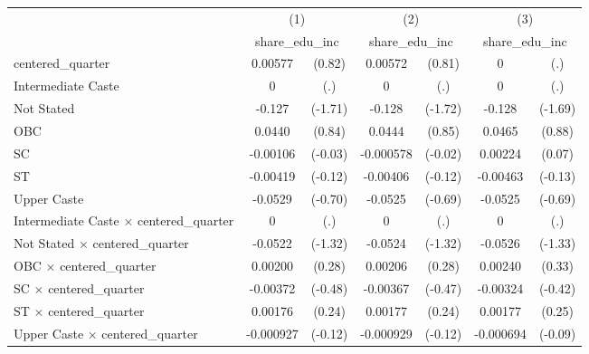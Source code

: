 {
\def\sym#1{\ifmmode^{#1}\else\(^{#1}\)\fi}
\begin{tabular}{l*{3}{cc}}
\hline\hline
                    &\multicolumn{2}{c}{(1)}           &\multicolumn{2}{c}{(2)}           &\multicolumn{2}{c}{(3)}           \\
                    &\multicolumn{2}{c}{share\_edu\_inc} &\multicolumn{2}{c}{share\_edu\_inc} &\multicolumn{2}{c}{share\_edu\_inc} \\
\hline
centered\_quarter    &     0.00577         &      (0.82)&     0.00572         &      (0.81)&           0         &         (.)\\
Intermediate Caste  &           0         &         (.)&           0         &         (.)&           0         &         (.)\\
Not Stated          &      -0.127         &     (-1.71)&      -0.128         &     (-1.72)&      -0.128         &     (-1.69)\\
OBC                 &      0.0440         &      (0.84)&      0.0444         &      (0.85)&      0.0465         &      (0.88)\\
SC                  &    -0.00106         &     (-0.03)&   -0.000578         &     (-0.02)&     0.00224         &      (0.07)\\
ST                  &    -0.00419         &     (-0.12)&    -0.00406         &     (-0.12)&    -0.00463         &     (-0.13)\\
Upper Caste         &     -0.0529         &     (-0.70)&     -0.0525         &     (-0.69)&     -0.0525         &     (-0.69)\\
Intermediate Caste $\times$ centered\_quarter&           0         &         (.)&           0         &         (.)&           0         &         (.)\\
Not Stated $\times$ centered\_quarter&     -0.0522         &     (-1.32)&     -0.0524         &     (-1.32)&     -0.0526         &     (-1.33)\\
OBC $\times$ centered\_quarter&     0.00200         &      (0.28)&     0.00206         &      (0.28)&     0.00240         &      (0.33)\\
SC $\times$ centered\_quarter&    -0.00372         &     (-0.48)&    -0.00367         &     (-0.47)&    -0.00324         &     (-0.42)\\
ST $\times$ centered\_quarter&     0.00176         &      (0.24)&     0.00177         &      (0.24)&     0.00177         &      (0.25)\\
Upper Caste $\times$ centered\_quarter&   -0.000927         &     (-0.12)&   -0.000929         &     (-0.12)&   -0.000694         &     (-0.09)\\

\end{tabular}}
